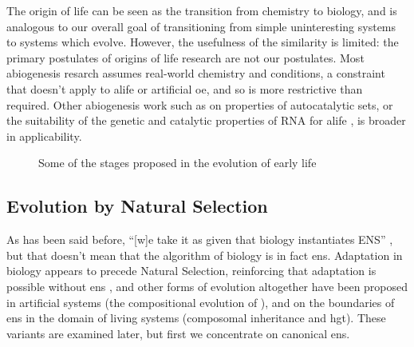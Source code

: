 The origin of life can be seen as the transition from chemistry to biology, and is analogous to our overall goal of transitioning from simple uninteresting systems to systems which evolve. However, the usefulness of the similarity is limited: the primary postulates of origins of life research are not our postulates. Most abiogenesis resarch assumes real-world chemistry and conditions, a constraint that doesn't apply to \gls{alife} or artificial \gls{oe}, and so is more restrictive than required. Other abiogenesis work such as on properties of autocatalytic sets, or the suitability of the genetic and catalytic properties of RNA for \gls{alife} \parencite{Cheng2010}, is broader in applicability.

\begin{figure}
	\begin{center}
	\end{center}
	\caption{Some of the stages proposed in the evolution of early life}
	\label{major-stages-early-life}
\end{figure}

\subsection{Evolution by Natural Selection}\label{evolution-by-natural-selection}

As has been said before, ``[w]e take it as given that biology instantiates ENS'' \parencite{Watson2012}, but that doesn't mean that the algorithm of biology is in fact \gls{ens}. Adaptation in biology appears to precede Natural Selection, reinforcing that adaptation is possible without \gls{ens} \parencite{Watson2010}, and other forms of evolution altogether have been proposed in artificial systems (\eg the compositional evolution of \textcite{Arthur2009}), and on the boundaries of \gls{ens} in the domain of living systems (\eg composomal inheritance and \gls{hgt}). These variants are examined later, but first we concentrate on canonical \gls{ens}.

